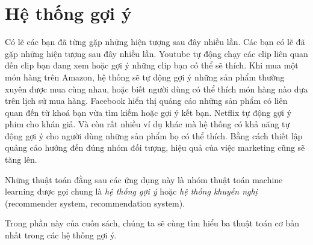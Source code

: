 \part{Hệ thống gợi ý}
\label{part:recsys}
Có lẽ các bạn đã từng gặp những hiện tượng sau đây nhiều lần. Các bạn có lẽ đã
gặp những hiện tượng sau đây nhiều lần. Youtube tự động chạy các clip liên quan
đến clip bạn đang xem hoặc gợi ý những clip bạn có thể sẽ thích. Khi mua một món
hàng trên Amazon, hệ thống sẽ tự động gợi ý những sản phẩm thường xuyên được mua
cùng nhau, hoặc biết người dùng có thể thích món hàng nào dựa trên lịch sử mua
hàng. Facebook hiển thị quảng cáo những sản phẩm có liên quan đến từ khoá bạn
vừa tìm kiếm hoặc gợi ý kết bạn. Netflix tự động gợi ý phim cho khán giả. Và còn
rất nhiều ví dụ khác mà hệ thống có khả năng tự động gợi ý cho người dùng những
sản phẩm họ {có thể thích}. Bằng cách thiết lập quảng cáo hướng đến đúng nhóm
đối tượng, hiệu quả của việc marketing cũng sẽ tăng lên.


Những thuật toán đằng sau các ứng dụng này là nhóm thuật toán machine learning
được gọi chung là \textit{hệ thống gợi ý} hoặc \textit{hệ thống khuyến nghị}
(recommender system, recommendation system).



Trong phần này của cuốn sách, chúng ta sẽ cùng tìm hiểu ba thuật toán cơ bản
nhất trong các hệ thống gợi ý.

